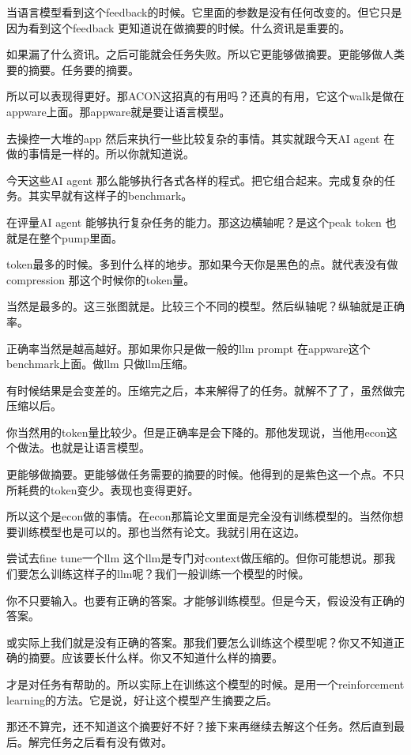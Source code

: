 \documentclass[12pt,a4paper]{article}
\begin{document}
当语言模型看到这个feedback的时候。它里面的参数是没有任何改变的。但它只是因为看到这个feedback 更知道说在做摘要的时候。什么资讯是重要的。

如果漏了什么资讯。之后可能就会任务失败。所以它更能够做摘要。更能够做人类要的摘要。任务要的摘要。

所以可以表现得更好。那ACON这招真的有用吗？还真的有用，它这个walk是做在appware上面。那appware就是要让语言模型。

去操控一大堆的app 然后来执行一些比较复杂的事情。其实就跟今天AI agent 在做的事情是一样的。所以你就知道说。

今天这些AI agent 那么能够执行各式各样的程式。把它组合起来。完成复杂的任务。其实早就有这样子的benchmark。

在评量AI agent 能够执行复杂任务的能力。那这边横轴呢？是这个peak token 也就是在整个pump里面。

token最多的时候。多到什么样的地步。那如果今天你是黑色的点。就代表没有做compression 那这个时候你的token量。

当然是最多的。这三张图就是。比较三个不同的模型。然后纵轴呢？纵轴就是正确率。

正确率当然是越高越好。那如果你只是做一般的llm prompt 在appware这个benchmark上面。做llm 只做llm压缩。

有时候结果是会变差的。压缩完之后，本来解得了的任务。就解不了了，虽然做完压缩以后。

你当然用的token量比较少。但是正确率是会下降的。那他发现说，当他用econ这个做法。也就是让语言模型。

更能够做摘要。更能够做任务需要的摘要的时候。他得到的是紫色这一个点。不只所耗费的token变少。表现也变得更好。

所以这个是econ做的事情。在econ那篇论文里面是完全没有训练模型的。当然你想要训练模型也是可以的。那也当然有论文。我就引用在这边。

尝试去fine tune一个llm 这个llm是专门对context做压缩的。但你可能想说。那我们要怎么训练这样子的llm呢？我们一般训练一个模型的时候。

你不只要输入。也要有正确的答案。才能够训练模型。但是今天，假设没有正确的答案。

或实际上我们就是没有正确的答案。那我们要怎么训练这个模型呢？你又不知道正确的摘要。应该要长什么样。你又不知道什么样的摘要。

才是对任务有帮助的。所以实际上在训练这个模型的时候。是用一个reinforcement learning的方法。它是说，好让这个模型产生摘要之后。

那还不算完，还不知道这个摘要好不好？接下来再继续去解这个任务。然后直到最后。解完任务之后看有没有做对。
\end{document}
